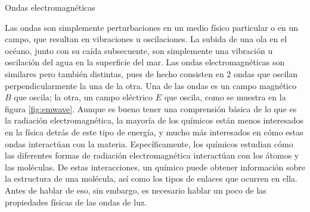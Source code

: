 \begin{sectionbox}{Ondas electromagnéticas}
\begin{minipage}{0.5\linewidth}
\begin{figure}[H]
        \end{figure}
    \end{minipage}
    
    Las ondas son simplemente perturbaciones en un medio físico particular o en un campo, que resultan en vibraciones u oscilaciones. La subida de una ola en el océano, junto con su caída subsecuente, son simplemente una vibración u oscilación del agua en la superficie del mar. Las ondas electromagnéticas son similares pero también distintas, pues de hecho consisten en 2 ondas que oscilan perpendicularmente la una de la otra. Una de las ondas es un {\color{blue}campo magnético $B$} que oscila; la otra, un {\color{red}campo eléctrico $E$} que oscila, como se muestra en la figura \ref{fig:emwave}.
    Aunque es bueno tener una comprensión básica de lo que es la radiación electromagnética, la mayoría de los químicos están menos interesados en la física detrás de este tipo de energía, y mucho más interesados en cómo estas ondas interactúan con la materia. Específicamente, los químicos estudian cómo las diferentes formas de radiación electromagnética interactúan con los átomos y las moléculas. De estas interacciones, un químico puede obtener información sobre la estructura de una molécula, así como los tipos de enlaces que ocurren en ella. Antes de hablar de eso, sin embargo, es necesario hablar un poco de las propiedades físicas de las ondas de luz.
\end{sectionbox}